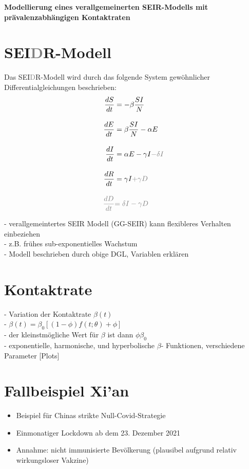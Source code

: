 \documentclass{scrartcl}
\begin{document}
\begin{center}
\huge\textbf{Modellierung eines verallgemeinerten SEIR-Modells mit prävalenzabhängigen Kontaktraten}
\end{center}

\section{SEI\textcolor{gray}{D}R-Modell}

Das SEI\textcolor{gray}{D}R-Modell wird durch das folgende System gewöhnlicher Differentialgleichungen beschrieben:
\begin{align*}
\frac{dS}{dt} &= -\beta \frac{SI}{N} \\[10pt]
\frac{dE}{dt} &= \beta \frac{SI}{N} - \alpha E \\[10pt]
\frac{dI}{dt} &= \alpha E - \gamma I \textcolor{gray}{- \delta I} \\[10pt] 
\frac{dR}{dt} &= \gamma I \textcolor{gray}{+ \gamma D} \\[10pt] 
\textcolor{gray}{\frac{dD}{dt}} &\textcolor{gray}{= \delta I - \gamma D}
\end{align*}

- verallgemeintertes SEIR Modell (GG-SEIR) kann flexibleres Verhalten einbeziehen \\
- z.B. frühes sub-exponentielles Wachstum \\
- Modell beschrieben durch obige DGL, Variablen erklären \\

\section{Kontaktrate}
- Variation der Kontaktrate $\beta(t) $ \\
- $\beta(t) = \beta_0 [(1- \phi) f(t; \theta) + \phi]$ \\
- der kleinstmögliche Wert für $\beta$ ist dann $\phi\beta_0$ \\

- exponentielle, harmonische, und hyperbolische $\beta$- Funktionen, verschiedene Parameter [Plots] \\

%
%

\section{Fallbeispiel Xi'an}
	\begin{itemize}
		\item Beispiel für Chinas strikte Null-Covid-Strategie
		\item Einmonatiger Lockdown ab dem 23. Dezember 2021
		\item Annahme: nicht immunisierte Bevölkerung (plausibel aufgrund relativ wirkungsloser Vakzine)
	\end{itemize}
\end{document}
